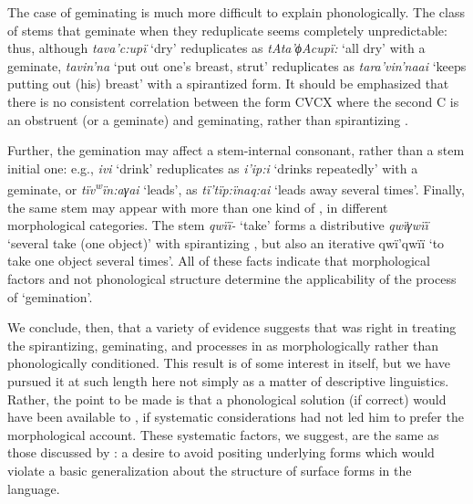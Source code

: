 The case of geminating  is much more difficult to explain
phonologically. The class of stems that geminate when they reduplicate
seems completely unpredictable: thus, although \emph{tava'c:upï }`dry'
reduplicates as \emph{t{\scriptsize A}ta'ϕ{\scriptsize A}cupï:} `all
dry' with a geminate,  \emph{tavin'na} `put out one's breast,
strut' reduplicates as \emph{tara'vin'naai} `keeps putting out (his)
breast' with a spirantized form. It should be emphasized that there is
no consistent correlation between the form CVCX where the second C is
an obstruent (or a geminate) and geminating, rather than spirantizing
.

Further, the gemination may affect a stem-internal consonant, rather
than a stem initial one: e.g., \emph{ivi} `drink' reduplicates as
\emph{i'ip:i} `drinks repeatedly' with a geminate, or
\emph{tïv\textsuperscript{w}ïn:aγai} `leads', as \emph{tï'tïp:ïnaq:ai}
`leads away several times'. Finally, the same stem may appear with
more than one kind of , in different morphological
categories. The stem \emph{qwïï-} `take' forms a distributive
\emph{qwïγwïï} `several take (one object)' with spirantizing
, but also an iterative qwï'qwïï `to take one object
several times'. All of these facts indicate that morphological factors
and not phonological structure determine the applicability of the
process of `gemination'.

We conclude, then, that a variety of evidence suggests that {\Sapir} was
right in treating the spirantizing, geminating, and 
processes in  as morphologically rather than
phonologically conditioned. This result is of some interest in itself,
but we have pursued it at such length here not simply as a matter of
descriptive linguistics. Rather, the point to be made is that a
phonological solution (if correct) would have been available to {\Sapir},
if systematic considerations had not led him to prefer the
morphological account. These systematic factors, we suggest, are the
same as those discussed by \citet{hale73:lardil}: a desire to avoid
positing underlying forms which would violate a basic generalization
about the structure of surface forms in the language.


